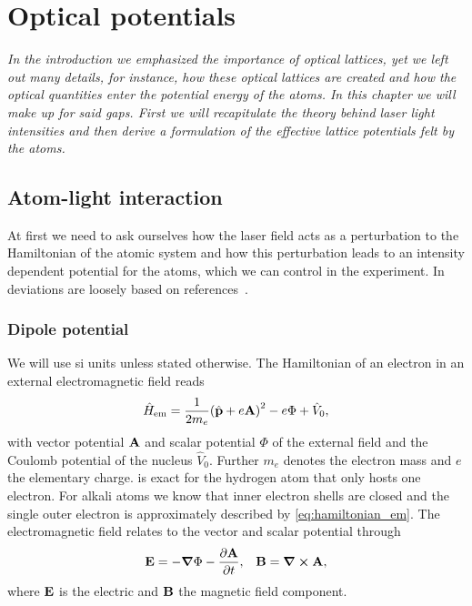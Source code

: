 \chapter{Optical potentials}

\textit{In the introduction we emphasized the importance of optical lattices,
yet we left out many details, for instance, how these optical lattices are
created and how the optical quantities enter the potential energy of the
atoms. In this chapter we will make up for said gaps. First we will
recapitulate the theory behind laser light intensities and then derive a
formulation of the effective lattice potentials felt by the atoms.}

\section{Atom-light interaction}

At first we need to ask ourselves how the laser field acts as a perturbation
to the Hamiltonian of the atomic system and how this perturbation leads to an
intensity dependent potential for the atoms, which we can control in the
experiment. In deviations are loosely based on
references~\cite{Gerry2004,Jackson2005,Bartelmann2018}.

\subsection{Dipole potential}

We will use \gls{si} units unless stated otherwise. The Hamiltonian of an electron
in an external electromagnetic field reads
\begin{equation}
  \hat{H}_\text{em}
  =\frac{1}{2m_e}{\left(\hat{\vb{p}}+e\vb{A}\right)}^2-e\Phi+\hat{V}_0
  \label{eq:hamiltonian_em},
\end{equation}
with vector potential $\vb{A}$ and scalar potential $\Phi$ of the external
field and the Coulomb potential of the nucleus $\hat{V}_0$. Further $m_e$
denotes the electron mass and $e$ the elementary charge.
 is exact for the hydrogen atom that only hosts one
electron. For alkali atoms we know that inner electron shells are closed and
the single outer electron is approximately described by
\cref{eq:hamiltonian_em}. The electromagnetic field relates to the
vector and scalar potential through
\begin{align}
  \vb{E}=-\grad{\Phi}-\pdv{\vb{A}}{t}, &&
  \vb{B}=\curl{\vb{A}},
  \label{eq:field_em_potentials}
\end{align}
where $\vb{E}$ is the electric and $\vb{B}$ the magnetic field component.

